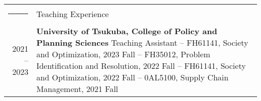 \documentclass[letterpaper,10pt]{article}
\newcommand{\headingfont}{\LARGE }
\newenvironment{SectionTable}[1]{
	\renewcommand*{\arraystretch}{1.0}
	\setlength{\tabcolsep}{10pt}
	\begin{longtable}{Rp{5.2in}} 
		\rule{2.5cm}{4pt} 
		& #1 \\ %
	}
	{
	\end{longtable}\vspace{-.3cm}
}
\begin{document}
\begin{SectionTable}{\headingfont Teaching Experience} %

	2021 -- 2023 & 
	\textbf{University of Tsukuba, College of Policy and Planning Sciences} \newline
	 Teaching Assistant \newline
	-- FH61141, Society and Optimization, 2023 Fall \newline
	-- FH35012, Problem Identification and Resolution, 2022 Fall \newline
	-- FH61141, Society and Optimization, 2022 Fall \newline
	-- 0AL5100, Supply Chain Management, 2021 Fall \\
	
%


\end{SectionTable}
\end{document}
